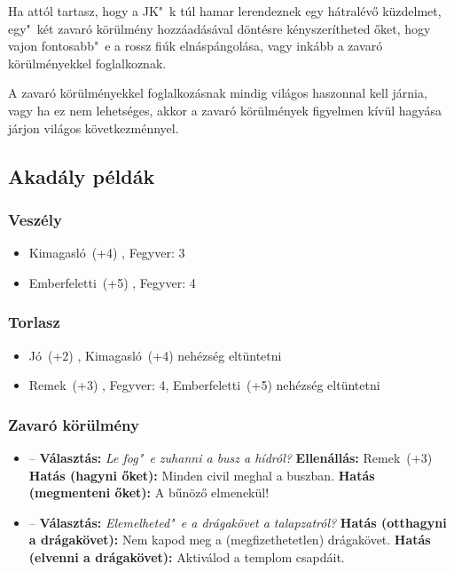 Ha attól tartasz, hogy a JK"~k túl hamar lerendeznek egy hátralévő küzdelmet, egy"~két zavaró körülmény hozzáadásával döntésre kényszerítheted őket, hogy vajon fontosabb"~e a rossz fiúk elnáspángolása, vagy inkább a zavaró körülményekkel foglalkoznak.

A zavaró körülményekkel foglalkozásnak mindig világos haszonnal kell járnia, vagy ha ez nem lehetséges, akkor a zavaró körülmények figyelmen kívül hagyása járjon világos következménnyel.

\subsection{Akadály példák}

\subsubsection{Veszély}

\begin{itemize}
    \item Kimagasló~(+4) , Fegyver: 3
    \item Emberfeletti~(+5) , Fegyver: 4
\end{itemize}

\subsubsection{Torlasz}

\begin{itemize}
    \item Jó~(+2) , Kimagasló~(+4) nehézség eltüntetni
    \item Remek~(+3) , Fegyver: 4, Emberfeletti~(+5) nehézség eltüntetni
\end{itemize}

\subsubsection{Zavaró körülmény}

\begin{itemize}
    \item {} – \textbf{Választás:} \textit{Le fog"~e zuhanni a busz a hídról?}
    \newline
    \textbf{Ellenállás:} Remek~(+3)
    \newline
    \textbf{Hatás (hagyni őket):} Minden civil meghal a buszban.
    \newline
    \textbf{Hatás (megmenteni őket):} A bűnöző elmenekül!
\end{itemize}

\begin{itemize}
    \item {} – \textbf{Választás:} \textit{Elemelheted"~e a drágakövet a talapzatról?}
    \newline
    \textbf{Hatás (otthagyni a drágakövet):} Nem kapod meg a (megfizethetetlen) drágakövet.
    \newline
    \textbf{Hatás (elvenni a drágakövet):} Aktiválod a templom csapdáit.
\end{itemize}
